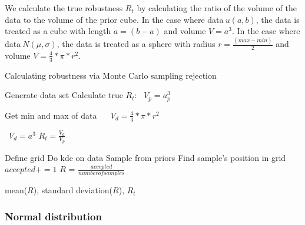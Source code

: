 We calculate the true robustness $R_t$ by calculating the ratio of the volume of the data to the volume of the prior cube. In the case where data$~u(a, b)$, the data is treated as a cube with length $a = (b - a)$ and volume $V = a^3$. In the case where data$~N(\mu, \sigma)$, the data is treated as a sphere with radius $r = \frac{(max - min)}{2}$ and volume $V = \frac{4}{3} * \pi * r^2$. 
 
\begin{algorithm}[H]
	\label{alg:robustness}
  \caption{Calculating robustness via Monte Carlo sampling rejection}
 \begin{algorithmic}[1]
    \Statex
    	\State Generate data set
    	\State Calculate true $R_t$: 
    	 \
    	\State $V_p = a_p^3$ 
    	
    		\State Get min and max of data \
    		 \
    		\State $V_d = \frac{4}{3} * \pi * r^2$ 
    	\EndIf
    	
    		 \
    		\State $V_d = a^3$
    		\State $R_t = \frac{V_d}{V_p}$
    	\EndIf
    	
    	\State Define grid
    	\State Do \acrfull{kde} on data
    		\State Sample from priors 
    		\Let{$F$}{KDE > $Z$}
    		\State Find sample's position in grid
				\If{position $\in$ $F$}
    				\State $accepted += 1$
    			\EndIf
    		\EndIf
    		\State $R$ = $\frac{accep
    	ted}{number of samples}$
    	\EndFor

  \EndFor  
   \State \Return mean($R$), standard deviation($R$), $R_t$
  \end{algorithmic}
\end{algorithm}	

\clearpage


\subsubsection{Normal distribution}



